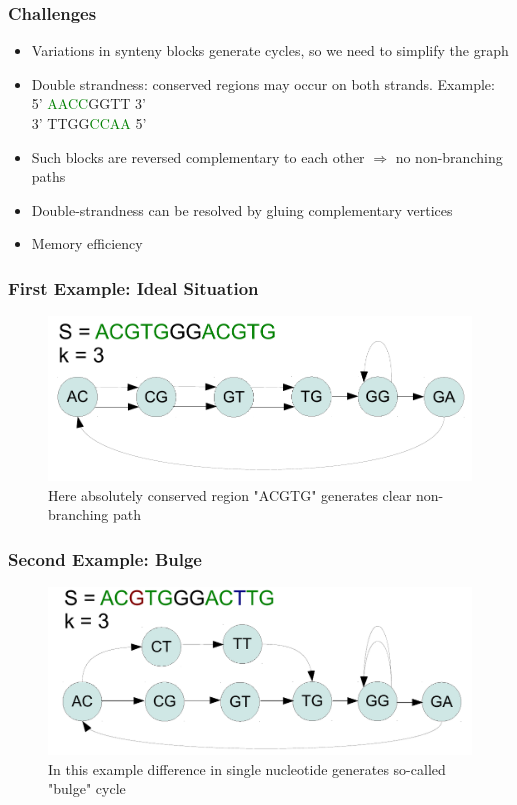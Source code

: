 \documentclass[svgnames,14pt]{beamer}
\begin{document}
\begin{frame}
\frametitle{Challenges}
\begin{itemize}
\item Variations in synteny blocks generate cycles, so we need to simplify the graph
\item Double strandness: conserved regions may occur on both strands. Example: \\
5' \textcolor{Green}{AACC}GGTT 3' \\
3' TTGG\textcolor{Green}{CCAA} 5'
\item Such blocks are reversed complementary to each other \( \Rightarrow \) no non-branching paths
\item Double-strandness can be resolved by gluing complementary vertices
\item Memory efficiency
\end{itemize}
\end{frame}

\begin{frame}
\frametitle{First Example: Ideal Situation}
\begin{figure}
\centering
\includegraphics[scale = 0.60]{Figure3.pdf}
\small \caption{Here absolutely conserved region "ACGTG" generates clear non-branching path}
\end{figure}
\end{frame}

\begin{frame}
\frametitle{Second Example: Bulge}
\begin{figure}
\centering
\includegraphics[scale = 0.60]{Figure4.pdf}
\small \caption{In this example difference in single nucleotide generates so-called "bulge" cycle}
\end{figure}
\end{frame}
\end{document}
